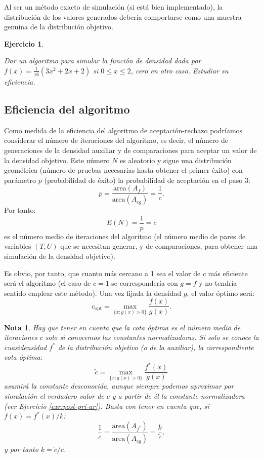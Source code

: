 \documentclass[
]{book}
\theoremstyle{break}
\newtheorem{exercise}{Ejercicio}[chapter]
\theoremstyle{nonumberplain}
\newtheorem{remark}{Nota}
\begin{document}
Al ser un método exacto de simulación (si está bien implementado), la distribución de los valores generados debería comportarse como una muestra genuina de la distribución objetivo.

\begin{exercise}
\protect\hypertarget{exr:dacotada-ar}{}\label{exr:dacotada-ar}

Dar un algoritmo para simular la función de densidad dada por
\(f\left(x\right) = \frac{1}{16} \left( 3x^{2}+2x+2 \right)\) si
\(0 \le x \le 2\), cero en otro caso. Estudiar su eficiencia.
\end{exercise}

\hypertarget{eficiencia-del-algoritmo}{%
\subsection{Eficiencia del algoritmo}\label{eficiencia-del-algoritmo}}

Como medida de la eficiencia del algoritmo de aceptación-rechazo podríamos considerar el número de iteraciones del algoritmo, es decir, el número de generaciones de la densidad auxiliar y de comparaciones para aceptar un valor de la densidad objetivo.
Este número \(N\) es aleatorio y sigue una distribución geométrica (número de pruebas necesarias hasta obtener el primer éxito) con parámetro \(p\) (probabilidad de éxito) la probabilidad de aceptación en el paso 3:
\[p = \frac{\text{area}\left(A_{f}\right)}{\text{area}\left( A_{cg}\right)} = \frac{1}{c}.\]
Por tanto:
\[E\left( N \right) = \frac1p = c\]
es el número medio de iteraciones del algoritmo (el número medio de pares de variables \(\left( T,U\right)\) que se necesitan generar, y de comparaciones, para obtener una simulación de la densidad objetivo).

Es obvio, por tanto, que cuanto más cercano a 1 sea el valor de \(c\) más eficiente será el algoritmo (el caso de \(c=1\) se correspondería con \(g=f\) y no tendría sentido emplear este método).
Una vez fijada la densidad \(g\), el valor óptimo será:
\[c_{\text{opt}}=\max_{\{x : g(x) > 0\}} \frac{f(x)}{g(x)}.\]

\begin{remark}
Hay que tener en cuenta que la cota óptima es el número medio de iteraciones \(c\) solo si conocemos las constantes normalizadoras.
Si solo se conoce la cuasidensidad \(f^{\ast}\) de la distribución objetivo (o de la auxiliar), la correspondiente cota óptima:
\[\tilde{c} = \max_{\{x : g(x) > 0\}} \frac{f^{\ast}(x)}{g(x)}\]
asumirá la constante desconocida, aunque siempre podemos aproximar por simulación el verdadero valor de \(c\) y a partir de él la constante normalizadora (ver Ejercicio \ref{exr:post-pri-ar}).
Basta con tener en cuenta que, si \(f(x) = f^{\ast}(x)/k\):
\[\frac{1}{c} = \frac{\text{area}\left(A_{f^{\ast}}\right)}{\text{area}\left( A_{\tilde{c}g}\right)} = \frac{k}{\tilde{c}},\]
y por tanto \(k= \tilde{c}/c\).
\end{remark}
\end{document}

